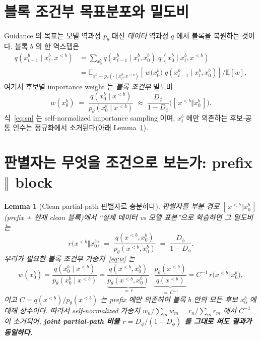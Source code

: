 \documentclass[11pt]{article}
\newcommand{\xpre}{x^{<b}}        %
\newcommand{\xblk}{x^{b}}         %
\newcommand{\pth}{p_\theta}
\newcommand{\Dphi}{D_\phi}
\theoremstyle{plain}
\newtheorem{lemma}{Lemma}
\theoremstyle{definition}
\begin{document}
\section{블록 조건부 목표분포와 밀도비}

Guidance 의 목표는 모델 역과정 $\pth$ 대신 \emph{데이터} 역과정 $q$ 에서 블록을 복원하는 것이다.
블록 $b$ 의 한 역스텝은
\begin{align}
q(\xblk_{t-1}\mid \xblk_t,\xpre)
 &= \sum_{\xblk_0} q(\xblk_{t-1}\mid \xblk_t,\xblk_0)\; q(\xblk_0\mid \xblk_t,\xpre)
 \label{eq:target}\\
 &= \mathbb{E}_{\xblk_0\sim \pth(\cdot\mid \xblk_t,\xpre)}
      \!\left[\, w\big(\xblk_0\big)\; q(\xblk_{t-1}\mid \xblk_t,\xblk_0)\right]\big/
      \mathbb{E}\!\left[w\right],
 \label{eq:sn}
\end{align}
여기서 후보별 importance weight 는 \emph{블록 조건부} 밀도비
\begin{equation}
w(\xblk_0)\;=\;\frac{q(\xblk_0\mid \xpre)}{\pth(\xblk_0\mid \xpre)}
\;\approx\;\frac{\Dphi}{1-\Dphi}\Big([\,\xpre \Vert \xblk_0\,]\Big).
\label{eq:w}
\end{equation}
식~\eqref{eq:sn} 는 self-normalized importance sampling 이며, $\xblk_t$ 에만 의존하는
후보-공통 인수는 정규화에서 소거된다(아래 Lemma~\ref{lem:partial}).

\section{판별자는 무엇을 조건으로 보는가: prefix $\Vert$ block}

\begin{lemma}[Clean partial-path 판별자로 충분하다]\label{lem:partial}
판별자를 \emph{부분 경로} $[\,\xpre\Vert\xblk_0\,]$(prefix + 현재 clean 블록)에서
``실제 데이터 vs 모델 표본''으로 학습하면 그 밀도비는
\begin{equation}
r\big(\xpre\Vert\xblk_0\big)\;=\;\frac{q(\xpre,\xblk_0)}{\pth(\xpre,\xblk_0)}
\;=\;\frac{\Dphi}{1-\Dphi}.
\end{equation}
우리가 필요한 블록 조건부 가중치~\eqref{eq:w} 는
\begin{equation}
w(\xblk_0)=\frac{q(\xblk_0\mid\xpre)}{\pth(\xblk_0\mid\xpre)}
=\underbrace{\frac{q(\xpre,\xblk_0)}{\pth(\xpre,\xblk_0)}}_{=\,r}\cdot
\underbrace{\frac{\pth(\xpre)}{q(\xpre)}}_{=\,C^{-1}}
= C^{-1}\, r\big(\xpre\Vert\xblk_0\big),
\label{eq:lemma1}
\end{equation}
이고 $C=q(\xpre)/\pth(\xpre)$ 는 \emph{prefix 에만} 의존하여 블록 $b$ 안의 모든 후보
$\xblk_0$ 에 대해 상수이다. 따라서 self-normalized 가중치
$w_n/\sum_m w_m = r_n/\sum_m r_m$ 에서 $C^{-1}$ 이 소거되어,
\textbf{joint partial-path 비율 $r=\Dphi/(1-\Dphi)$ 를 그대로 써도 결과가 동일하다.}
\end{lemma}
\end{document}

